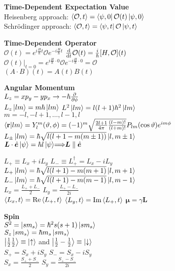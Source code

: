 \documentclass[11pt, a4paper]{article}
\newcommand{\newsec}[1]{\vspace{2mm}\textbf{#1}\\}
\renewcommand{\vec}[1]{\bm{#1}} %
\newcommand{\uvec}[1]{\hat{\vec{#1}}} %
\let\spaceyimplies\implies
\renewcommand{\implies}{\hspace{-1mm}\spaceyimplies\hspace{-1mm}}
\renewcommand{\O}{\mathcal{O}}  %
\newcommand{\tev}{e^{-i\frac{H}{\hbar}t}}  %
\newcommand{\tevp}{e^{i\frac{H}{\hbar}t}}  %
\newcommand{\ua}{\uparrow}  %
\newcommand{\da}{\downarrow}  %
\renewcommand{\k}[1]{\ket{#1}}
\begin{document}
\begin{multicols}{2}
\newsec{Time-Dependent Expectation Value}
Heisenberg approach: $ \ev{\O, t} = \bra{\psi, 0} \O(t) \ket{\psi, 0} $\\
Schr\"{o}dinger approach: $ \ev{\O, t} = \bra{\psi, t} \O \ket{\psi, t} $

\newsec{Time-Dependent Operator}
$ \O(t) = \tevp \O \tev $ \qquad $ \dv{t}\O(t) = \frac{i}{\hbar}[H, \O](t) $\\
$ \O(t)\big |_{t = 0} = e^{i\frac{H}{\hbar}\cdot 0}\O e^{-i\frac{H}{\hbar}\cdot 0} = \O $\\
$ (A\cdot B)(t) = A(t) B(t) $

\newsec{Angular Momentum}
$ L_{z} = xp_{y} - yp_{x} \to - \hbar \pdv{\phi}$\\
$L_z \ket{lm} = m \hbar \ket{lm}$ \qquad $L^2 \ket{lm} = l(l+1)\hbar^2 \ket{lm}$ \\
$m = -l, -l + 1, \dots, l - 1, l$ \\
$\braket{\vb r}{lm} = Y_l^m(\vartheta, \phi) = (-1)^m \sqrt{\frac{2l + 1}{4 \pi} \frac{(l-m)!}{(l + m)!}} P_{lm}(\cos \vartheta) e^{i m \phi}$\\

$L_\pm \ket{lm} = \hbar \sqrt{l(l+1 - m (m \pm 1))} \ket{l, m \pm 1}$ \medskip \\


$ \vec{L}\cdot \uvec{e} \ket{\psi} = \hbar l \ket{\psi} \implies \vec{L} \parallel \uvec{e} $

$ L_{+} \equiv L_{x} + i L_{y} $ \qquad $ L_{-} \equiv L_{+}^{\dagger} = L_{x} - i L_{y} $\\
$ L_{+}\ket{lm} = \hbar \sqrt{l (l+1) - m(m+1)} \ket{l, m+1} $ \\
$ L_{-}\ket{lm} = \hbar \sqrt{l (l+1) - m(m-1)} \ket{l, m-1}  $\\
$ L_{x} = \frac{L_{+} + L_{-}}{2} $ \qquad \qquad \quad  $ L_{y} = \frac{L_{+} - L_{-}}{2i} $\\
$ \ev{L_{x}, t} = \Re \ev{L_{+}, t} $ \qquad $ \ev{L_{y}, t}= \Im \ev{L_{+}, t} $
$ \bm{\mu} = \gamma \bm{L} $


\newsec{Spin}
$ S^{2} = \k{sm_{s}} = \hbar^{2}s(s+1)\k{sm_{s}} $ \\
$ S_{z}\k{sm_{s}} = \hbar m_{s}\k{sm_{s}} $ \\
$  \ket{\frac{1}{2}\frac{1}{2}}  \equiv \k{\ua} $ and $ \ket{\frac{1}{2}-\frac{1}{2}}  \equiv \ket{\da} $\\

$ S_{+} = S_{x} + iS_{y} $ \qquad $ S_{-} = S_{x} - i S_{y} $\\
$ S_{x} = \frac{S_{+}+S_{-}}{2} $ \qquad \quad $ S_{y} = \frac{S_{+}-S_{-}}{2i} $


\end{multicols}
\end{document}
